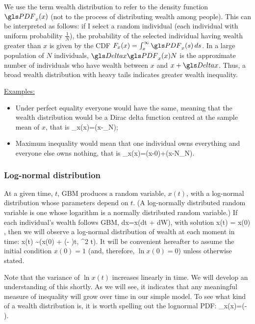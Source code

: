 We use the term wealth distribution to refer to the density function 
$\PDF_x(x)$ (not to the process of distributing wealth among people). This can be 
interpreted as follows: if I select a random individual (each individual with uniform probability 
$\frac{1}{N}$), the probability of the selected individual 
having wealth greater than $x$ is given by the CDF $F_x(x)=\int_x^\infty \PDF_x(s)\,ds$.
In a large population of $N$ individuals, $\D x \PDF_x(x)N$ is the approximate 
number of individuals who have wealth between $x$ and $x+\D x$. 
Thus, a broad wealth distribution with heavy tails indicates greater wealth inequality.

\underline{Examples:}
\begin{itemize}
\item Under perfect equality everyone would have the same, meaning that the wealth
distribution would be a Dirac delta function centred at the sample mean of $x$, that is
\be
\PDF_x(x)=\delta(x-_N);
\ee
\item
Maximum inequality would mean that one individual owns everything
and everyone else owns nothing, that is
\be 
\PDF_x(x)=\delta(x-0)+\delta(x-N_N).
\ee
\end{itemize}


\subsubsection{Log-normal distribution}
At a given time, $t$, GBM produces a random variable, $x(t)$, with a log-normal distribution whose parameters depend on $t$. (A log-normally distributed random variable is one whose logarithm is a normally distributed random variable.) If each individual's wealth follows GBM,
\be
dx=x(\mu dt + \sigma dW),
\ee
with solution 
\be
x(t) = x(0) \exp{},
\ee
then we will observe a log-normal distribution of wealth at each moment in time:
\be
\ln x(t) \sim {}\left(\ln x(0) + \left(\mu - \right)t, \sigma^2 t\right).
\ee
It will be convenient hereafter to assume the initial condition $x(0)=1$ (and, therefore, $\ln x(0)=0$) unless otherwise stated.

Note that the variance of $\ln x(t)$ increases linearly in time. We will develop an understanding of this shortly. As we will see, it indicates that any meaningful measure of inequality will grow over time in our simple model. To see what kind of a wealth distribution  is, it is worth spelling out the lognormal PDF:
\be
\PDF_x(x)=\exp\left(- \right).
\ee

